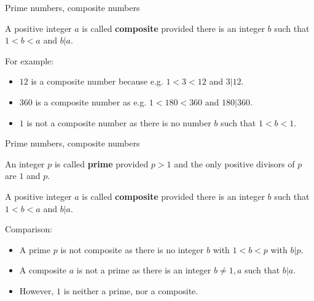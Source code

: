 \documentclass{beamer}
\begin{document}
\begin{frame}[t]{Prime numbers, composite numbers}
\vspace{0.5cm}
\begin{definition}
A positive integer $a$ is called \textbf{composite} provided there is an integer $b$ such that $1<b<a$ and $b|a$.
\end{definition}
For example:
\begin{itemize}
\item<3-> $12$ is a composite number because e.g. $1<3<12$ and $3|12$.
\item<5-> $360$ is a composite number as e.g. $1<180<360$ and $180|360$.
\item<7-> $1$ is not a composite number as there is no number $b$ such that $1<b<1$.
\end{itemize}
\end{frame}

\begin{frame}{Prime numbers, composite numbers}
\begin{definition}
An integer $p$ is called \textbf{prime} provided $p>1$ and the only positive divisors of $p$ are $1$ and $p$.
\end{definition}

\begin{definition}
A positive integer $a$ is called \textbf{composite} provided there is an integer $b$ such that $1<b<a$ and $b|a$.
\end{definition}
Comparison:
\begin{itemize}
\item A prime $p$ is not composite as there is no integer $b$ with $1<b<p$ with $b|p$.\pause
\item A composite $a$ is not a prime as there is an integer $b\neq 1,a$ such that $b|a$.\pause
\item However, $1$ is neither a prime, nor a composite.
\end{itemize}
\end{frame}
\end{document}
